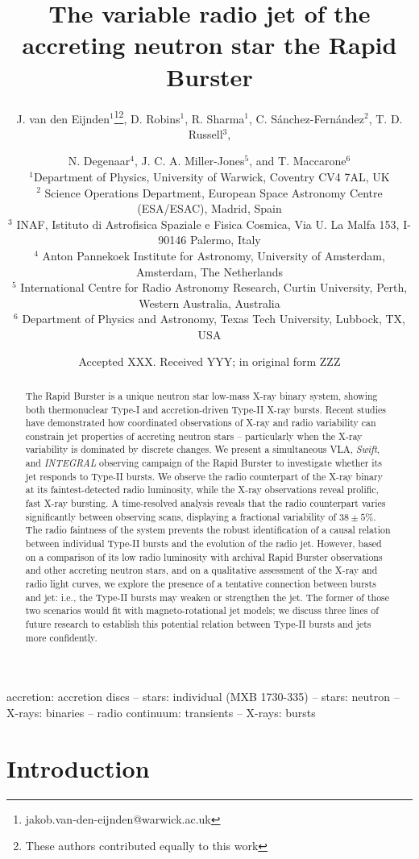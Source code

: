 \documentclass[fleqn,usenatbib]{mnras}
\title[The radio jet of the Rapid Burster]{The variable radio jet of the accreting neutron star the Rapid Burster}
\author[J. van den Eijnden, D. Robins, R. Sharma et al.]{J. van den Eijnden$^{1}$\thanks{jakob.van-den-eijnden@warwick.ac.uk}\thanks{These authors contributed equally to this work}, D. Robins$^{1}$\footnotemark[2], R. Sharma$^{1}$\footnotemark[2], C. S\'anchez-Fern\'andez$^{2}$, T. D. Russell$^{3}$, \and N. Degenaar$^{4}$, J. C. A. Miller-Jones$^{5}$, and T. Maccarone$^{6}$
\\
$^{1}$Department of Physics, University of Warwick, Coventry CV4 7AL, UK\\
$^{2}$ Science Operations Department, European Space Astronomy Centre (ESA/ESAC), Madrid, Spain \\
$^{3}$ INAF, Istituto di Astrofisica Spaziale e Fisica Cosmica, Via U. La Malfa 153, I-90146 Palermo, Italy \\
$^{4}$ Anton Pannekoek Institute for Astronomy, University of Amsterdam, Amsterdam, The Netherlands \\
$^{5}$ International Centre for Radio Astronomy Research, Curtin University, Perth, Western Australia, Australia \\
$^{6}$ Department of Physics and Astronomy, Texas Tech University, Lubbock, TX, USA
}
\date{Accepted XXX. Received YYY; in original form ZZZ}
\begin{document}
\label{firstpage}
\pagerange{\pageref{firstpage}--\pageref{lastpage}}
\maketitle

\begin{abstract}
The Rapid Burster is a unique neutron star low-mass X-ray binary system, showing both thermonuclear Type-I and accretion-driven Type-II X-ray bursts. Recent studies have demonstrated how coordinated observations of X-ray and radio variability can constrain jet properties of accreting neutron stars -- particularly when the X-ray variability is dominated by discrete changes. We present a simultaneous VLA, \textit{Swift}, and \textit{INTEGRAL} observing campaign of the Rapid Burster to investigate whether its jet responds to Type-II bursts. We observe the radio counterpart of the X-ray binary at its faintest-detected radio luminosity, while the X-ray observations reveal prolific, fast X-ray bursting. A time-resolved analysis reveals that the radio counterpart varies significantly between observing scans, displaying a fractional variability of $38 \pm 5$\%. The radio faintness of the system prevents the robust identification of a causal relation between individual Type-II bursts and the evolution of the radio jet. However, based on a comparison of its low radio luminosity with archival Rapid Burster observations and other accreting neutron stars, and on a qualitative assessment of the X-ray and radio light curves, we explore the presence of a tentative connection between bursts and jet: i.e., the Type-II bursts may weaken or strengthen the jet. The former of those two scenarios would fit with magneto-rotational jet models; we discuss three lines of future research to establish this potential relation between Type-II bursts and jets more confidently.
\end{abstract}

\begin{keywords}
accretion: accretion discs -- stars: individual (MXB 1730-335) -- stars: neutron -- X-rays: binaries -- radio continuum: transients -- X-rays: bursts
\end{keywords}

\section{Introduction}
\end{document}

